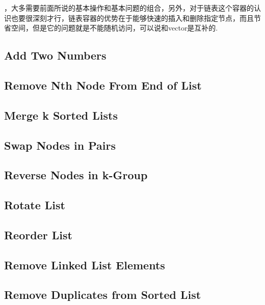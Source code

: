 \documentclass{article}
\begin{document}
\begin{CJK}{UTF8}{gbsn}     %

\else
    
，大多需要前面所说的基本操作和基本问题的组合，另外，对于链表这个容器的认识也要很深刻才行，链表容器的优势在于能够快速的插入和删除指定节点，而且节省空间，但是它的问题就是不能随机访问，可以说和vector是互补的.
\subsection{Add Two Numbers}

\subsection{Remove Nth Node From End of List}

\subsection{Merge k Sorted Lists}

\subsection{Swap Nodes in Pairs}

\subsection{Reverse Nodes in k-Group}

\subsection{Rotate List}

\subsection{Reorder List}

\subsection{Remove Linked List Elements}

\subsection{Remove Duplicates from Sorted List}


\end{CJK}
\end{document}
